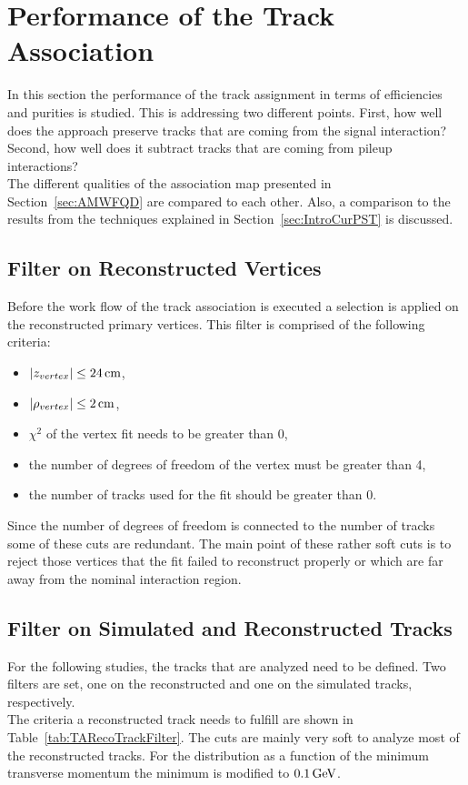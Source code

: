 \chapter{Performance of the Track Association \label{sec:TrackAss} }

In this section the performance of the track assignment in terms of efficiencies and purities is studied. This is addressing two different points. First, how well does the approach preserve tracks that are coming from the signal interaction? Second, how well does it subtract tracks that are coming from pileup interactions?\\
The different qualities of the association map presented in Section~\ref{sec:AMWFQD} are compared to each other. Also, a comparison to the results from the techniques explained in Section~\ref{sec:IntroCurPST} is discussed.

\section{Filter on Reconstructed Vertices \label{sec:TAFVC}}

Before the work flow of the track association is executed a selection is applied on the reconstructed primary vertices. This filter is comprised of the following criteria:
\begin{itemize}
    \item $ \left| z_{vertex} \right| \leq 24\,\text{cm}$,
    \item $ \left| \rho_{vertex} \right| \leq 2\,\text{cm}$,
    \item $\chi^{2}$ of the vertex fit needs to be greater than 0,
    \item the number of degrees of freedom of the vertex must be greater than 4,
    \item the number of tracks used for the fit should be greater than 0.
\end{itemize}
Since the number of degrees of freedom is connected to the number of tracks some of these cuts are redundant. The main point of these rather soft cuts is to reject those vertices that the fit failed to reconstruct properly or which are far away from the nominal interaction region.

\section{Filter on Simulated and Reconstructed Tracks \label{sec:TAFSRT}}

For the following studies, the tracks that are analyzed need to be defined. Two filters are set, one on the reconstructed and one on the simulated tracks, respectively. \\
The criteria a reconstructed track needs to fulfill are shown in Table~\ref{tab:TARecoTrackFilter}. The cuts are mainly very soft to analyze most of the reconstructed tracks. For the distribution as a function of the minimum transverse momentum the minimum \pt{} is modified to $0.1\,\text{Ge\hspace{-.08em}V}$. \\

